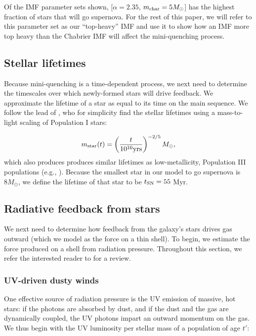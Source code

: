 \documentclass[a4paper,11pt]{article}
\begin{document}
Of the IMF parameter sets shown, [$\alpha=2.35$, $m_{\rm char} = 5 M_{\odot}$] has the highest fraction of stars that will go supernova. For the rest of this paper, we will refer to this parameter set as our ``top-heavy'' IMF and use it to show how an IMF more top heavy than the Chabrier IMF will affect the mini-quenching process.

\subsection{Stellar lifetimes}

Because mini-quenching is a time-dependent process, we next need to determine the timescales over which newly-formed stars will drive feedback. We approximate the lifetime of a star as equal to its time on the main sequence. We follow the lead of \cite{Orr2019}, who for simplicity find the stellar lifetimes using a mass-to-light scaling of Population I stars:

\begin{equation}
    m_{\rm star}(t) = \left( \frac{t}{10^{10} \rm yrs} \right)^{-2/5} M_{\odot}, \label{eq:ms_lifetime}
\end{equation}
%
which also produces produces similar lifetimes as low-metallicity, Population III populations (e.g., \cite{Schaerer2002, Klessen2023}).
Because the smallest star in our model to go supernova is $8 M_{\odot}$, we define the lifetime of that star to be $t_{\rm SN} = 55$ Myr.

\subsection{Radiative feedback from stars}

We next need to determine how feedback from the galaxy's stars drives gas outward (which we model as the force on a thin shell). To begin, we estimate the force produced on a shell from radiation pressure. 
Throughout this section, we refer the interested reader to \cite{Thompson2024_review} for a review.

\subsubsection{UV-driven dusty winds}

One effective source of radiation pressure is the UV emission of massive, hot stars: if the photons are absorbed by dust, and if the dust and the gas are dynamically coupled, the UV photons impart an outward momentum on the gas. We thus begin with the UV luminosity per stellar mass of a population of age $t'$:
\end{document}
